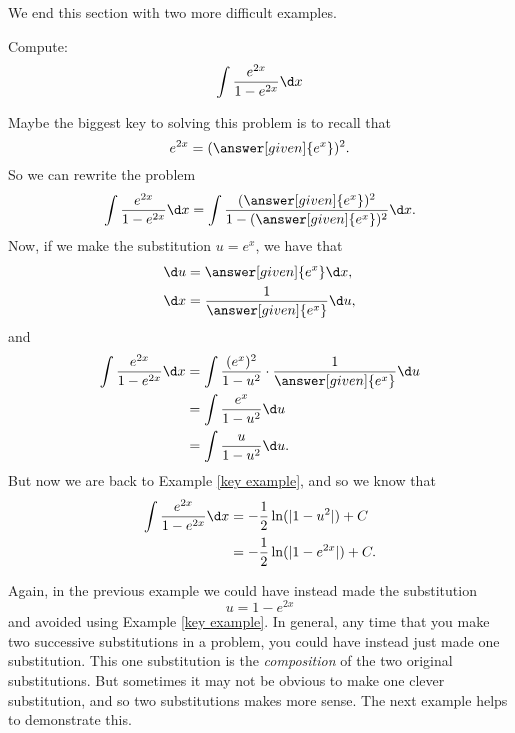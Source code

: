 \documentclass{ximera}
\begin{document}
We end this section with two more difficult examples.



\begin{example}
Compute:
\[
\int \frac{e^{2x}}{1 - e^{2x}} \d x
\]
\begin{explanation}
Maybe the biggest key to solving this problem is to recall that
\[
e^{2x} = (\answer[given]{e^x})^2.
\]
So we can rewrite the problem
\[
\int \frac{e^{2x}}{1 - e^{2x}} \d x = \int \frac{(\answer[given]{e^x})^2}{1 - (\answer[given]{e^x})^2} \d x.
\]
Now, if we make the substitution $u = e^x$, we have that
\begin{align*}
\d u &= \answer[given]{e^x} \d x,\\
\d x &= \frac{1}{\answer[given]{e^x}} \d u,
\end{align*}
and
\begin{align*}
\int \frac{e^{2x}}{1 - e^{2x}} \d x &= \int \frac{(e^x)^2}{1 - u^2} \cdot \frac{1}{\answer[given]{e^x}} \d u  \\
&= \int \frac{e^x}{1-u^2} \d u  \\
&= \int \frac{u}{1-u^2} \d u.
\end{align*}
But now we are back to Example \ref{key example}, and so we know that
\begin{align*}
\int \frac{e^{2x}}{1 - e^{2x}} \d x &= - \frac{1}{2} \ln(|1-u^2|) + C  \\
&= - \frac{1}{2} \ln(|1 - e^{2x}|) + C.
\end{align*}
\end{explanation}
\end{example}


Again, in the previous example we could have instead made the substitution 
\[
u = 1 - e^{2x}
\]
and avoided using Example \ref{key example}.  
In general, any time that you make two successive substitutions in a problem, you could have instead just made one substitution.  
This one substitution is the \textit{composition} of the two original substitutions.  
But sometimes it may not be obvious to make one clever substitution, and so two substitutions makes more sense.  
The next example helps to demonstrate this.
\end{document}
